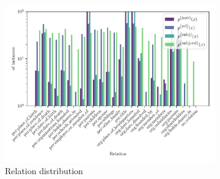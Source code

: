 \begin{figure}
  \centering
  \begin{subfigure}{\textwidth}
    \includegraphics[width=\textwidth]{figures/analysis/selective_supervised_relations}
    \caption{Relation distribution}
  \end{subfigure}

  \caption[Comparison of relation sampling distributions]{\label{fig:kbpo:selective_supervised_relation}
  }
\end{figure}




